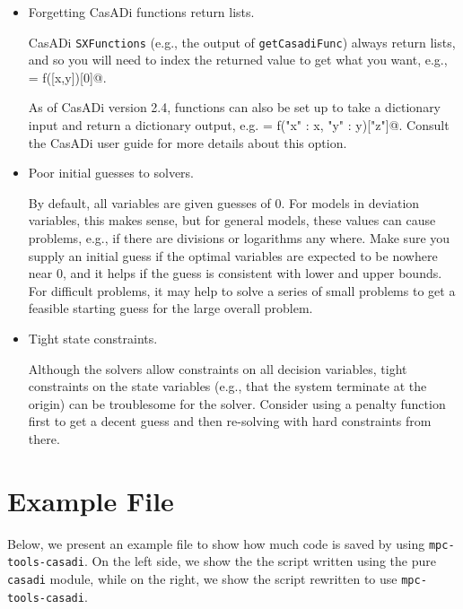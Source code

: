 \documentclass{article}
\newcommand{\casadi}{CasADi}
\begin{document}
\begin{itemize}
    \item Forgetting \casadi{} functions return lists.
    
    \casadi{} \texttt{SXFunctions} (e.g., the output of \texttt{getCasadiFunc}) always return lists, and so you will need to index the returned value to get what you want, e.g., \lstinline@z = f([x,y])[0]@.
    
    As of \casadi{} version 2.4, functions can also be set up to take a dictionary input and return a dictionary output, e.g. \lstinline@z = f({"x" : x, "y" : y})["z"]@.
    Consult the \casadi{} user guide for more details about this option.
    
    \item Poor initial guesses to solvers.
    
    By default, all variables are given guesses of 0.
    For models in deviation variables, this makes sense, but for general models, these values can cause problems, e.g., if there are divisions or logarithms any where.
    Make sure you supply an initial guess if the optimal variables are expected to be nowhere near 0, and it helps if the guess is consistent with lower and upper bounds.
    For difficult problems, it may help to solve a series of small problems to get a feasible starting guess for the large overall problem.
    
    \item Tight state constraints.
    
    Although the solvers allow constraints on all decision variables, tight constraints on the state variables (e.g., that the system terminate at the origin) can be troublesome for the solver.
    Consider using a penalty function first to get a decent guess and then re-solving with hard constraints from there.
    
\end{itemize}

\section{Example File}

Below, we present an example file to show how much code is saved by using \texttt{mpc-tools-casadi}.
On the left side, we show the the script written using the pure \texttt{casadi} module, while on the right, we show the script rewritten to use \texttt{mpc-tools-casadi}.

\hspace{1em}


\end{document}
